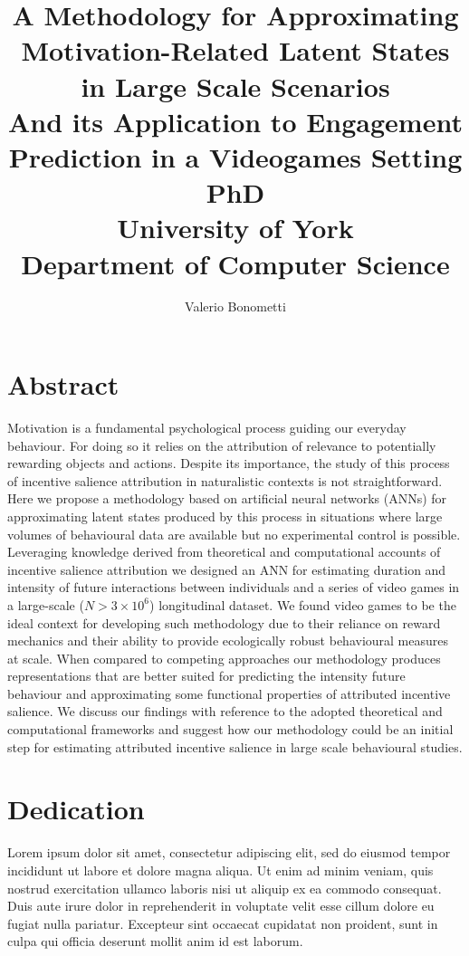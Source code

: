 \documentclass{yorkThesis}
\title{
{A Methodology for Approximating Motivation-Related Latent States in Large Scale Scenarios}\\
{\small And its Application to Engagement Prediction in a Videogames Setting}\\
{\Large PhD}\\
{\large University of York}\\
{\large Department of Computer Science}\\

}
\author{Valerio Bonometti}
\newcommand{\lorem}{Lorem ipsum dolor sit amet, consectetur adipiscing elit, sed do eiusmod tempor incididunt ut labore et dolore magna aliqua. Ut enim ad minim veniam, quis nostrud exercitation ullamco laboris nisi ut aliquip ex ea commodo consequat. Duis aute irure dolor in reprehenderit in voluptate velit esse cillum dolore eu fugiat nulla pariatur. Excepteur sint occaecat cupidatat non proident, sunt in culpa qui officia deserunt mollit anim id est laborum.\\}
\begin{document}
\maketitle

\chapter*{Abstract}
Motivation is a fundamental psychological process guiding our everyday behaviour. For doing so it relies on the attribution of relevance to potentially rewarding objects and actions. Despite its importance, the study of this process of incentive salience attribution in naturalistic contexts is not straightforward. Here we propose a methodology based on artificial neural networks (ANNs) for approximating latent states produced by this process in situations where large volumes of behavioural data are available but no experimental control is possible. Leveraging knowledge derived from theoretical and computational accounts of incentive salience attribution we designed an ANN for estimating duration and intensity of future interactions between individuals and a series of video games in a large-scale ($N> 3 \times 10^6$) longitudinal dataset. We found video games to be the ideal context for developing such methodology due to their reliance on reward mechanics and their ability to provide ecologically robust behavioural measures at scale. When compared to competing approaches our methodology produces representations that are better suited for predicting the intensity future behaviour and approximating some functional properties of attributed incentive salience. We discuss our findings with reference to the adopted theoretical and computational frameworks and suggest how our methodology could be an initial step for estimating attributed incentive salience in large scale behavioural studies.

\chapter*{Dedication}
\lorem
\end{document}
